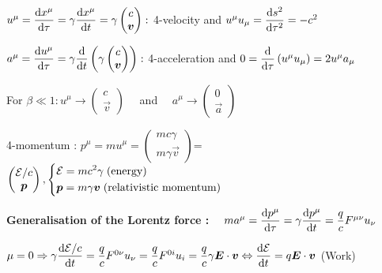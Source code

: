 \begin{squishlist}

\item $u^{\mu} = \dfrac{\textrm{d} x^{\mu}}{\textrm{d} \tau} = \gamma \dfrac{\textrm{d} x^{\mu}}{\textrm{d} t} = \gamma
\begin{pmatrix}
c \\
\mbox{\boldmath$v$}
\end{pmatrix} : $ 4-velocity and $u^{\mu}u_{\mu} = \dfrac{\textrm{d} s^2}{\textrm{d} \tau^2} = -c^2$

\item $a^{\mu} = \dfrac{\textrm{d} u^{\mu}}{\textrm{d} \tau}  = \gamma \dfrac{\textrm{d} }{\textrm{d}  t}\left(\gamma
\begin{pmatrix}
c \\
\mbox{\boldmath$v$}
\end{pmatrix}\right) : $ 4-acceleration and $ 0 = \dfrac{\textrm{d} }{\textrm{d} \tau}\left(u^{\mu}u_{\mu}\right) = 2u^{\mu}a_{\mu}$

\item For $\beta \ll 1 : u^{\mu} \rightarrow 
\begin{pmatrix}
c\\
\vec{v}
\end{pmatrix} \quad $ and $ \quad a^{\mu} \rightarrow
\begin{pmatrix}
0\\
\vec{a}
\end{pmatrix}$


\item 4-momentum : $p^{\mu} = m u^{\mu}= 
\begin{pmatrix}
    mc\gamma \\
    m\gamma \Vec{v}
\end{pmatrix}$=$\begin{pmatrix}
    \E/c \\
    \Vec{p}
\end{pmatrix}, \left\{
\begin{aligned} &\E = mc^2\gamma  \text{\;(energy)} \\ &\vec{p} = m\gamma \Vec{v}\text{\;(relativistic momentum)}
\end{aligned} \right.
$

\item[] \textbf{Generalisation of the Lorentz force :} $\quad ma^{\mu} = \dfrac{\textrm{d} p^\mu}{\textrm{d} \tau} = \gamma\dfrac{\textrm{d} p^\mu}{\textrm{d} t} = \dfrac{q}{c} F^{\mu\nu}u_{\nu}$

\item $\mu = 0 \Rightarrow \gamma\dfrac{\ud \E/c}{\ud t} = \dfrac{q}{c} F^{0\nu}u_{\nu}= \dfrac{q}{c} F^{0i}u_{i} = \dfrac{q}{c}\gamma\Vec{E}\cdot\Vec{v} \Leftrightarrow \dfrac{\ud \E}{\ud t}= q\Vec{E}\cdot\Vec{v}$ \quad (Work)  


\end{squishlist}
